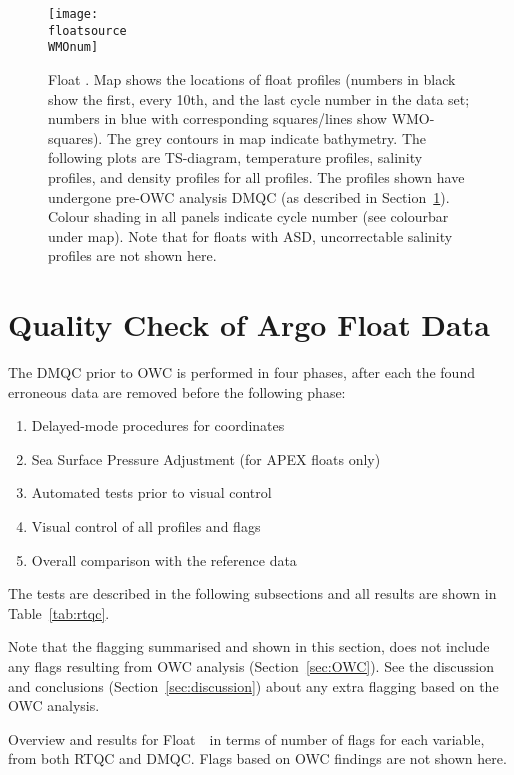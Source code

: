 \documentclass{article}
\begin{document}
\begin{figure}[hp]
  \centerline{\texttt{[image: \\floatsource\\WMOnum]}}
  \caption{Float \WMOnum. Map shows the locations of float profiles (numbers in
    black show the first, every 10th, and the last cycle number in the data
    set; numbers in blue with corresponding squares/lines show
    WMO-squares). The grey contours in map indicate bathymetry. The
    following plots are TS-diagram, temperature profiles, salinity
    profiles, and density profiles for all profiles. The profiles shown
    have undergone pre-OWC analysis DMQC (as described in
    Section~\protect\ref{DMQCpreOWC}).  Colour shading in all panels
    indicate cycle number (see colourbar under map).
    Note that for floats with ASD, uncorrectable salinity profiles are not
    shown here.}
  \label{fig:float-info}
\end{figure} 
 
        
\newpage
\section{Quality Check of Argo Float Data}\label{DMQCpreOWC}
%
The DMQC prior to OWC is performed in four phases, after each the found
erroneous data are removed before the following phase:
\begin{enumerate}
\item Delayed-mode procedures for coordinates
\item Sea Surface Pressure Adjustment (for APEX floats only)
\item Automated tests prior to visual control
\item Visual control of all profiles and flags
\item Overall comparison with the reference data
\end{enumerate}
The tests are described in the following subsections and all results are
shown in Table~\ref{tab:rtqc}.
%
%

% 
Note that the flagging summarised and shown in this section, does not
include any flags resulting from OWC analysis (Section~\ref{sec:OWC}). See
the discussion and conclusions (Section~\ref{sec:discussion}) about any
extra flagging based on the OWC analysis.
%
\begin{table}[!ht]
  \caption{Overview and results for Float~\WMOnum\ in terms of number of
    flags for each variable, from both RTQC and DMQC. 
    Flags based on OWC findings are not shown here.}
  \label{tab:rtqc}
  \centering
  
\end{table}     
\end{document}
